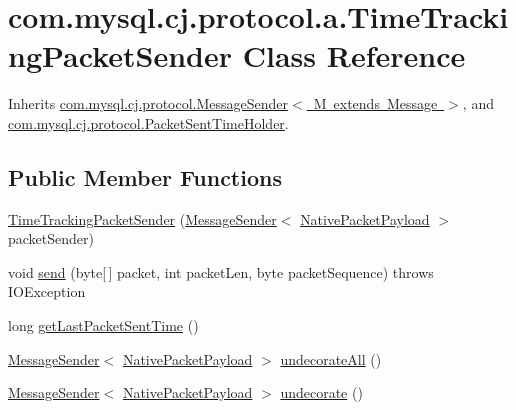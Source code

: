 \hypertarget{classcom_1_1mysql_1_1cj_1_1protocol_1_1a_1_1_time_tracking_packet_sender}{}\section{com.\+mysql.\+cj.\+protocol.\+a.\+Time\+Tracking\+Packet\+Sender Class Reference}
\label{classcom_1_1mysql_1_1cj_1_1protocol_1_1a_1_1_time_tracking_packet_sender}


Inherits \mbox{\hyperlink{interfacecom_1_1mysql_1_1cj_1_1protocol_1_1_message_sender}{com.\+mysql.\+cj.\+protocol.\+Message\+Sender$<$ M extends Message $>$}}, and \mbox{\hyperlink{interfacecom_1_1mysql_1_1cj_1_1protocol_1_1_packet_sent_time_holder}{com.\+mysql.\+cj.\+protocol.\+Packet\+Sent\+Time\+Holder}}.

\subsection*{Public Member Functions}
\begin{DoxyCompactItemize}
\item 
\mbox{\hyperlink{classcom_1_1mysql_1_1cj_1_1protocol_1_1a_1_1_time_tracking_packet_sender_a8e0719ea263ea8230a1b60b1cdaa9d0f}{Time\+Tracking\+Packet\+Sender}} (\mbox{\hyperlink{interfacecom_1_1mysql_1_1cj_1_1protocol_1_1_message_sender}{Message\+Sender}}$<$ \mbox{\hyperlink{classcom_1_1mysql_1_1cj_1_1protocol_1_1a_1_1_native_packet_payload}{Native\+Packet\+Payload}} $>$ packet\+Sender)
\item 
void \mbox{\hyperlink{classcom_1_1mysql_1_1cj_1_1protocol_1_1a_1_1_time_tracking_packet_sender_a5bb1efc7043c5417509cd079cc7abd0d}{send}} (byte\mbox{[}$\,$\mbox{]} packet, int packet\+Len, byte packet\+Sequence)  throws I\+O\+Exception 
\item 
long \mbox{\hyperlink{classcom_1_1mysql_1_1cj_1_1protocol_1_1a_1_1_time_tracking_packet_sender_a0db4b1e081138c550906e898d9c9a79d}{get\+Last\+Packet\+Sent\+Time}} ()
\item 
\mbox{\hyperlink{interfacecom_1_1mysql_1_1cj_1_1protocol_1_1_message_sender}{Message\+Sender}}$<$ \mbox{\hyperlink{classcom_1_1mysql_1_1cj_1_1protocol_1_1a_1_1_native_packet_payload}{Native\+Packet\+Payload}} $>$ \mbox{\hyperlink{classcom_1_1mysql_1_1cj_1_1protocol_1_1a_1_1_time_tracking_packet_sender_a26a673b209acd1d181f62dceed280750}{undecorate\+All}} ()
\item 
\mbox{\hyperlink{interfacecom_1_1mysql_1_1cj_1_1protocol_1_1_message_sender}{Message\+Sender}}$<$ \mbox{\hyperlink{classcom_1_1mysql_1_1cj_1_1protocol_1_1a_1_1_native_packet_payload}{Native\+Packet\+Payload}} $>$ \mbox{\hyperlink{classcom_1_1mysql_1_1cj_1_1protocol_1_1a_1_1_time_tracking_packet_sender_a5e29cda7005857f658352ef487c541ac}{undecorate}} ()
\end{DoxyCompactItemize}


